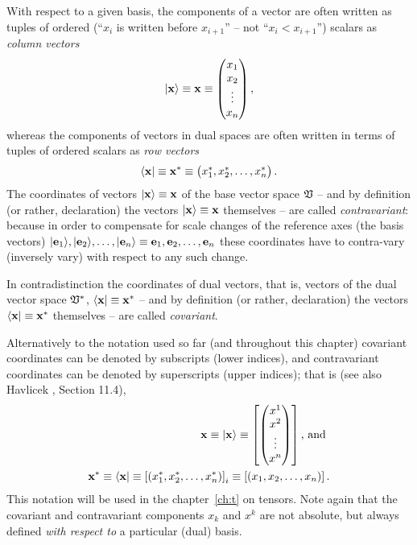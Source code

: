 With respect to a given basis,
the components of a vector are often written as tuples of ordered
(``$x_i$ is written before $x_{i+1}$'' -- not ``$x_i < x_{i+1}$'')
scalars  as {\em column vectors}
\begin{equation}
\vert {\bf x} \rangle
\equiv
{\bf x}
\equiv
\begin{pmatrix}
x_1\\x_2\\
\vdots \\
x_n
\end{pmatrix}
,
\end{equation}
whereas the components of vectors in dual spaces are often written in terms of
tuples of ordered
scalars  as {\em row vectors}
\begin{equation}
\langle {\bf x} \vert
\equiv
{\bf x}^\ast \equiv
\begin{pmatrix}
x_1^\ast ,x_2^\ast ,\ldots , x_n^\ast
\end{pmatrix}
.
\end{equation}
The coordinates  of  vectors $\vert {\bf x} \rangle
\equiv
{\bf x}
$
of the base vector space ${\frak V}$
-- and by definition (or rather, declaration) the vectors $\vert {\bf x} \rangle
\equiv
{\bf x}
$ themselves --
are called
{\em contravariant}:
because in order to compensate for scale changes of the reference axes (the basis vectors)
$\vert {\bf e}_1 \rangle ,\vert  {\bf e}_2\rangle ,\ldots ,\vert {\bf e}_n\rangle
\equiv
{\bf e}_1, {\bf e}_2,\ldots ,{\bf e}_n$
these coordinates have to contra-vary (inversely vary)  with respect to any such change.

In contradistinction the coordinates of dual vectors,
that is, vectors of the dual vector space ${\frak V}^\ast$,
$\langle {\bf x} \vert
\equiv
{\bf x}^\ast $ -- and by definition (or rather, declaration) the vectors $\langle {\bf x} \vert
\equiv
{\bf x}^\ast $ themselves --
are called
{\em covariant}.

Alternatively to the notation used so far (and throughout this chapter)
covariant coordinates can be denoted by subscripts (lower indices),
and contravariant coordinates can be denoted by superscripts (upper indices); that is
(see also
Havlicek \cite{havlicek-laftm}, Section 11.4),
\begin{equation}
\begin{split}
{\bf x}  \equiv
\vert {\bf x}  \rangle \equiv
\left[
\begin{pmatrix}
x^1\\
x^2\\
\vdots \\
x^n
\end{pmatrix}\right]
\textrm{, and }
\\
 {\bf x}^\ast \equiv
\langle {\bf x}  \vert \equiv
\left[
(x_1^\ast ,x_2^\ast ,\ldots , x_n^\ast  )\right]_i \equiv \left[(x_1,x_2,\ldots , x_n )\right]  .
\end{split}
\end{equation}
This notation will be used in the chapter~\ref{ch:t} on tensors.
Note again that the covariant and contravariant components
$x_k$ and $x^k$ are not absolute, but always defined {\em with respect to}
a particular (dual) basis.

